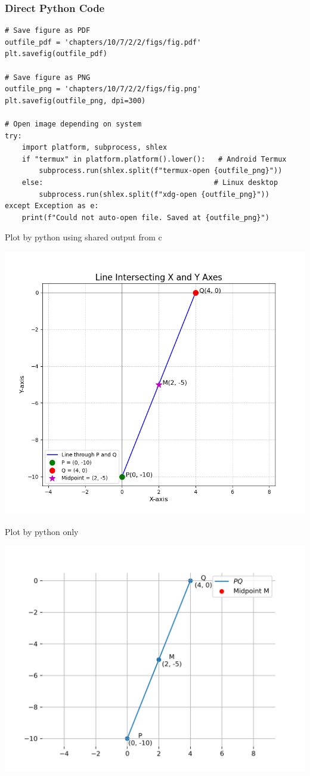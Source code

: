 \documentclass{beamer}
\begin{document}
\begin{frame}[fragile]
	\frametitle{Direct Python Code}
	\begin{lstlisting}
# Save figure as PDF
outfile_pdf = 'chapters/10/7/2/2/figs/fig.pdf'
plt.savefig(outfile_pdf)

# Save figure as PNG
outfile_png = 'chapters/10/7/2/2/figs/fig.png'
plt.savefig(outfile_png, dpi=300)

# Open image depending on system
try:
    import platform, subprocess, shlex
    if "termux" in platform.platform().lower():   # Android Termux
        subprocess.run(shlex.split(f"termux-open {outfile_png}"))
    else:                                        # Linux desktop
        subprocess.run(shlex.split(f"xdg-open {outfile_png}"))
except Exception as e:
    print(f"Could not auto-open file. Saved at {outfile_png}")
\end{lstlisting}
\end{frame}
\begin{frame}{Plot by python using shared output from c}
	\begin{center}
		\includegraphics[width=0.8\columnwidth]{figs/Figure_1.png}
	\end{center}
\end{frame}

\begin{frame}{Plot by python only}
	\begin{center}
		\includegraphics[width=0.9\columnwidth]{figs/fig.png}
	\end{center}
\end{frame}
\end{document}
